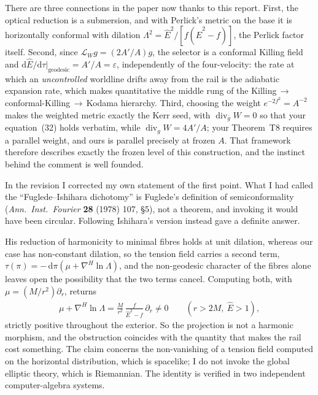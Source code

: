 \documentclass{article}
\begin{document}
There are three connections in the paper now thanks to this report. First, the
optical reduction is a submersion, and with Perlick's metric on the base it is
horizontally conformal with dilation \(\Lambda^2 = \hat E^2 / [f(\hat E^2-f)]\), the
Perlick factor itself. Second, since \(\mathcal{L}_Wg=(2A'/A)g\), the selector is a
conformal Killing field and
\(\mathrm{d} \hat E/\mathrm{d}\tau|_{\text{geodesic}}=A'/A=\varepsilon\),
independently of the four-velocity: the rate at which an \emph{uncontrolled}
worldline drifts away from the rail is the adiabatic expansion rate, which makes
quantitative the middle rung of the
Killing\,\(\to\)\,conformal-Killing\,\(\to\)\,Kodama hierarchy. Third, choosing the
weight \(e^{-2f^2}=A^{-2}\) makes the weighted metric exactly the Kerr seed, with
\(\operatorname{div}_{\bar g}W = 0\) so that your equation~(32) holds verbatim,
while \(\operatorname{div}_{g}W = 4A'/A\); your Theorem~T8 requires a parallel
weight, and ours is parallel precisely at frozen \(A\). That framework therefore
describes exactly the frozen level of this construction, and the instinct behind the
comment is well founded.

In the revision I corrected my own statement of the first point. What I had called
the ``Fuglede--Ishihara dichotomy'' is Fuglede's definition of semiconformality
(\emph{Ann.\ Inst.\ Fourier} \textbf{28} (1978) 107, \S5), not a theorem, and
invoking it would have been circular. Following Ishihara's version instead gave a
definite answer.

His reduction of harmonicity to minimal fibres holds at unit dilation, whereas our
case has non-constant dilation, so the tension field carries a second term,
\(\tau(\pi) = -\,\mathrm{d}\pi(\mu+\nabla^H\ln\Lambda)\), and the non-geodesic
character of the fibres alone leaves open the possibility that the two terms cancel.
Computing both, with \(\mu = (M/r^2)\partial_r\), returns
\begin{align*}
    \mu + \nabla^H\ln \Lambda
      = \frac{M}{r^2}\,\frac{f}{\hat E^2-f}\,\partial_r\neq 0
      \qquad (r> 2M,\ \hat E > 1),
\end{align*}
strictly positive throughout the exterior. So the projection is not a harmonic
morphism, and the obstruction coincides with the quantity that makes the rail cost
something. The claim concerns the non-vanishing of a tension field computed on the
horizontal distribution, which is spacelike; I do not invoke the global elliptic
theory, which is Riemannian. The identity is verified in two independent
computer-algebra systems.
\end{document}
